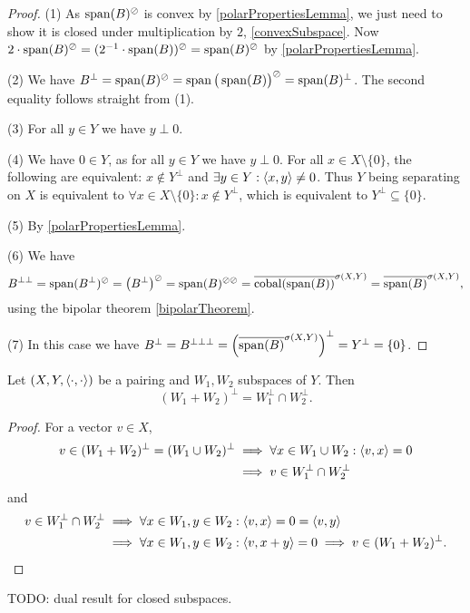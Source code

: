 \begin{proof}
(1) As $\operatorname{span}(B)^\oslash$ is convex by \ref{polarPropertiesLemma}, we just need to show it is closed under multiplication by $2$, \ref{convexSubspace}. Now $2\cdot \operatorname{span}(B)^\oslash = (2^{-1}\cdot\operatorname{span}(B))^\oslash = \operatorname{span}(B)^\oslash$ by \ref{polarPropertiesLemma}.

(2) We have $B^\perp = \operatorname{span}(B)^\oslash = \operatorname{span}\big(\operatorname{span}(B)\big)^\oslash = \operatorname{span}(B)^\perp$. The second equality follows straight from (1).

(3) For all $y\in Y$ we have $y\perp 0$.

(4) We have $0\in Y$, as for all $y\in Y$ we have $y\perp 0$. For all $x\in X\setminus\{0\}$, the following are equivalent: $x\notin Y^\perp$ and $\exists y\in Y: \left\langle x,y \right\rangle\neq 0$. Thus $Y$ being separating on $X$ is equivalent to $\forall x\in X\setminus \{0\}: x\notin Y^\perp$, which is equivalent to $Y^\perp \subseteq \{0\}$.

(5) By \ref{polarPropertiesLemma}.

(6) We have 
\[ B^{\perp\perp} = \operatorname{span}(B^\perp)^\oslash = \big(B^\perp\big)^\oslash = \operatorname{span}(B)^{\oslash\oslash} = \overline{\operatorname{cobal}(\operatorname{span}(B))}^{\sigma(X,Y)} = \overline{\operatorname{span}(B)}^{\sigma(X,Y)}, \]
using the bipolar theorem \ref{bipolarTheorem}.

(7) In this case we have $B^\perp = B^{\perp\perp\perp} = \left(\overline{\operatorname{span}(B)}^{\sigma(X,Y)}\right)^\perp = Y^\perp = \{0\}$.
\end{proof}


\begin{proposition}
Let $\left( X,Y,\left\langle \cdot,\cdot \right\rangle \right)$ be a pairing and $W_1,W_2$ subspaces of $Y$. Then
\[ (W_1+W_2)^\perp = W_1^\perp \cap W_2^\perp. \]
\end{proposition}
\begin{proof}
For a vector $v\in X$,
\begin{align*}
v\in (W_1+W_2)^\perp = (W_1 \cup W_2)^\perp &\implies \forall x\in W_1\cup W_2: \left\langle v,x \right\rangle = 0 \\
&\implies v\in W_1^\perp \cap W_2^\perp
\end{align*}
and
\begin{align*}
v\in W_1^\perp \cap W_2^\perp &\implies \forall x\in W_1, y\in W_2: \left\langle v,x \right\rangle = 0 = \left\langle v,y \right\rangle \\
&\implies \forall x\in W_1, y\in W_2:\left\langle v, x+y \right\rangle = 0 \implies v\in (W_1+W_2)^\perp.
\end{align*}
\end{proof}
TODO: dual result for closed subspaces.



